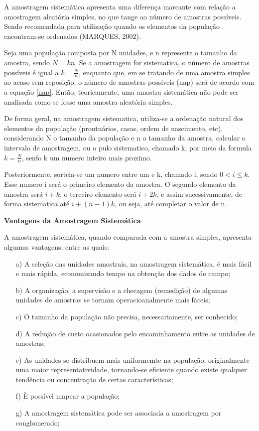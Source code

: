 A amostragem sistemática apresenta uma diferença marcante com relação a amostragem aleatória simples, no que tange
ao número de amostras possíveis. Sendo recomendada para utilização quando os elementos da população encontram-se
ordenados (MARQUES, 2002).\vskip0.3cm



Seja uma população composta por N unidades, e n represente o tamanho da amostra, sendo $N=kn$. Se a amostragem for sistematica, o número de amostras possíveis é igual a $k=\frac{N}{n}$, enquanto que, em se tratando de uma amostra simples ao acaso sem reposição, o número de amostras possíveis (nap) será de acordo com a equação \ref{nap}. Então, teoricamente, uma amostra sistemática não pode ser analisada como se fosse uma amostra aleatória simples. \vskip0.3cm



De forma geral, na amostragem sistematica, utiliza-se a ordenação
natural dos elementos da população (prontuários, casas, ordem de
nascimento, etc), considerando N o tamanho da população e n o
tamanho da amostra, calcular o intervalo de amostragem, ou o pulo
sistematico, chamado k, por meio da formula $k=\frac{N}{n}$, senfo
k um numero inteiro mais proximo.\vskip0.3cm

Posteriormente, sorteia-se um numero entre um e k, chamado i,
sendo $0 < i \leq k$. Esse numero i será o primeiro elemento da
amostra. O segundo elemento da amostra será $i+k$, o terceiro
elemento será $i+2k$, e assim sucessivamente, de forma sistematica
até $i+(n-1)k$, ou seja, até completar o valor de n.

\vskip0.3cm


\textbf{Vantagens da Amostragem Sistemática}
\vskip0.3cm

A amostragem sistemática, quando comparada com a amostra simples, apresenta algumas vantagens, entre as quais:



\begin{enumerate}
  \item[{a)}] A seleção das unidades amostrais, na amostragem sistemática, é mais fácil e mais rápida, economizando tempo na obtenção dos dados de campo;
  \item[{b)}] A organização, a supervisão e a checagem (remedição) de algumas unidades de amostras se tornam operacioanalmente mais fáceis;
  \item[{c)}] O tamanho da população não precisa, necessariamente, ser conhecido;
  \item[{d)}] A redução de custo ocasionados pelo encaminhamento entre as unidades de amostras;
  \item[{e)}] As unidades se distribuem mais uniformemte na população, originalmente uma maior representatividade, tornando-se eficiente quando existe qualquer tendência ou concentração de certas características;
  \item[{f)}] È possível mapear a população;
  \item[{g)}] A amostragem sistemática pode ser associada  a amostragem por conglomerado;
\end{enumerate}

